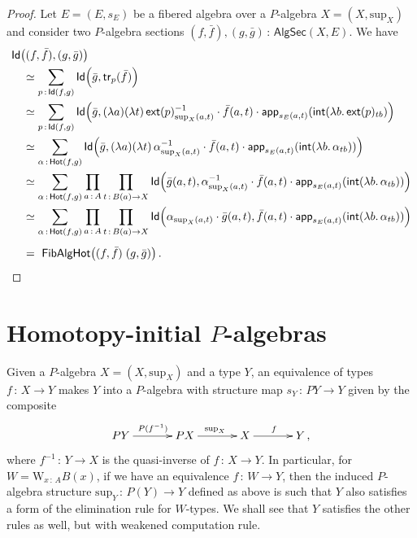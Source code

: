 \documentclass[10pt,a4paper,oneside,reqno]{amsart}
\theoremstyle{mythm}
\theoremstyle{mydef}
\theoremstyle{myrmk}
\newcommand{\co}{\,{:}\,}
\newcommand{\ct}{\cdot}
\newcommand{\trans}{\mathsf{tr}}
\newcommand{\Hot}{\mathsf{Hot}}
\newcommand{\ext}{\mathsf{ext}}
\renewcommand{\int}{\mathsf{int}}
\newcommand{\Id}{\mathsf{Id}}
\newcommand{\app}{\mathsf{app}}
\newcommand{\W}{\mathrm{W}}
\renewcommand{\sup}{\mathrm{sup}}
\newcommand{\FibAlgHot}{\mathsf{FibAlgHot}}
\newcommand{\PalgSec}{\mathsf{AlgSec}}
\begin{document}
\begin{proof}Let $E = (E, s_E)$ be a fibered algebra over a $P$-algebra $X = (X, \sup_X)$ and consider two $P$-algebra
sections $(f,\bar{f}), (g,\bar{g}) \co \PalgSec(X,E)$. We have
\begin{align*}
 & \Id\big( (f,\bar{f}),  (g,\bar{g}) \big) \\ 
& \quad \simeq \sum_{p \co \Id( f , g)} \Id \Big(\bar{g} , \trans_p ( \bar{f} ) \Big)  \\
& \quad \simeq \sum_{p \co \Id( f , g)} \Id \Big(\bar{g}, 
(\lambda a)(\lambda t) \, \ext(p)_{\sup_X(a,t)}^{-1} \ct \bar{f}(a,t) \ct \app_{s_E(a,t)}(\int (\lambda b . \, \ext(p)_{t  b})  \Big)  \\
& \quad \simeq \sum_{\alpha \co \Hot( f, g)} \Id \Big(\bar{g},  (\lambda a) (\lambda t) \, \alpha_{\sup_X(a,t)}^{-1} \ct \bar{f}(a,t) \ct 
\app_{s_E(a,t)} (\int (\lambda b. \,  \alpha_{t b}))  \Big)  \\
&\quad \simeq \sum_{\alpha \co \Hot( f, g)} \prod_{a \co A}\prod_{t \co B(a) \to X } \Id \Big(\bar{g}(a,t) , \alpha_{\sup_X(a,t)}^{-1} \ct \bar{f}(a,t) \ct \app_{s_E(a,t)}(\int (\lambda b. \, \alpha_{t  b})) \Big)  \\ 
& \quad \simeq \sum_{\alpha \co \Hot( f, g)} \prod_{a \co A}\prod_{t \co B(a) \to X } \Id \Big(\alpha_{\sup_X(a,t)} \ct \bar{g}(a,t) , \bar{f}(a,t) \ct 
\app_{s_E(a,t)}(\int  (\lambda b. \,  \alpha_{t  b})) \Big) \\[1ex]
& \quad = \  \FibAlgHot \big( (f,\bar{f}) \; (g,\bar{g}) \big) \, . \qedhere
\end{align*}  
\end{proof}


 

\section{Homotopy-initial $P$-algebras}

Given a $P$-algebra $X = (X, \sup_X)$ and a type $Y$, an equivalence of types $f \co X \to Y$ makes $Y$ into a $P$-algebra with structure map $s_Y \co PY \to Y$ given by the composite
\[
\xymatrix@C=1.2cm{
PY \ar[r]^{P(f^{-1})} & PX \ar[r]^{\sup_X} & X \ar[r]^f & Y \, , }
\]
 where $f^{-1} \co Y \to X$ is the quasi-inverse of $f \co X \to Y$. In particular, for $W = \W_{x \co A} B(x)$, if we have an equivalence  
 $f \co W \to Y$, then the induced $P$-algebra structure $\sup_Y \co P(Y)\to Y$ defined as above is such that $Y$ also satisfies 
 a form of the elimination rule for $W$-types.  We shall see that $Y$ satisfies the other rules as well, but with weakened computation rule.
\end{document}
